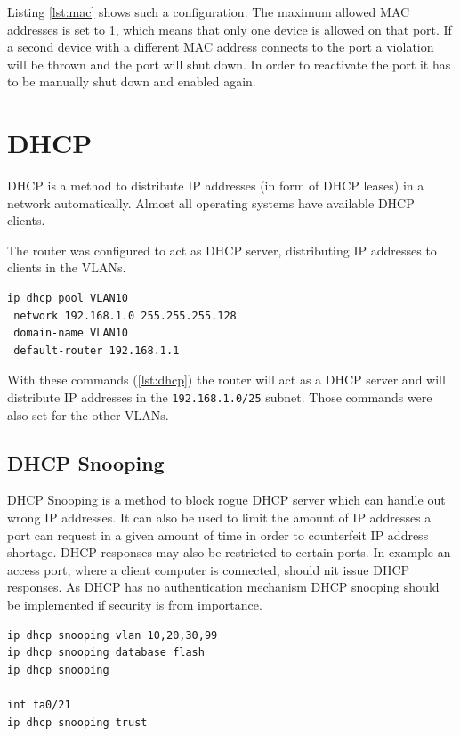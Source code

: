 Listing \ref{lst:mac} shows such a configuration. The maximum allowed \ac{MAC} addresses is set to 1, which means that only one device is allowed on that port. If a second device with a different \ac{MAC} address connects to the port a violation will be thrown and the port will shut down. In order to reactivate the port it has to be manually shut down and enabled again.

\chapter{DHCP}

\ac{DHCP} is a method to distribute IP addresses (in form of DHCP leases) in a network automatically. Almost all operating systems have available \ac{DHCP} clients.

The router was configured to act as \ac{DHCP} server, distributing IP addresses to clients in the \ac{VLAN}s.

\begin{lstlisting}[caption={DHCP},label={lst:dhcp},language={}]
ip dhcp pool VLAN10
 network 192.168.1.0 255.255.255.128
 domain-name VLAN10
 default-router 192.168.1.1
\end{lstlisting}

With these commands (\ref{lst:dhcp}) the router will act as a \ac{DHCP} server and will distribute IP addresses in the \texttt{192.168.1.0/25} subnet. Those commands were also set for the other VLANs.

\section{DHCP Snooping}

DHCP Snooping is a method to block rogue DHCP server which can handle out wrong IP addresses. It can also be used to limit the amount of IP addresses a port can request in a given amount of time in order to counterfeit IP address shortage. DHCP responses may also be restricted to certain ports. In example an access port, where a client computer is connected, should nit issue DHCP responses. As DHCP has no authentication mechanism DHCP snooping should be implemented if security is from importance.

\begin{lstlisting}[caption={DHCP Snooping},label={lst:dhcp_snop},language={}]
ip dhcp snooping vlan 10,20,30,99
ip dhcp snooping database flash
ip dhcp snooping

int fa0/21
ip dhcp snooping trust
\end{lstlisting}

